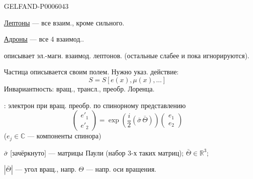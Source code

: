 \begin{GelfandAdjacentEvidence}{GELFAND-P000604}{3}


\underline{Лептоны} — все взаим., кроме сильного.

\underline{Адроны} — все 4 взаимод..

 описывает эл.-магн. взаимод. лептонов. (остальные слабее и пока игнорируются).

Частица описывается своим полем. Нужно указ. действие:
\[
S=S[e(x),\mu(x),\ldots]
\]
Инвариантность: вращ., трансл., преобр. Лоренца.

: электрон при вращ. преобр. по спинорному представлению
\[
\begin{pmatrix}e'_1\\e'_2\end{pmatrix}
=\exp\left(\frac i2(\bar\sigma\,\bar\Theta)\right)
\begin{pmatrix}e_1\\e_2\end{pmatrix}
\]
\hfill(\(e_j\in\mathbb C\) — компоненты спинора)\par

\(\bar\sigma\) [зачёркнуто] — матрицы Паули (набор 3-х таких матриц); \(\bar\Theta\in\mathbb R^3\);
\end{GelfandAdjacentEvidence}


\(|\bar\Theta|\) — угол вращ., напр. \(\Theta\) — напр. оси вращения.


